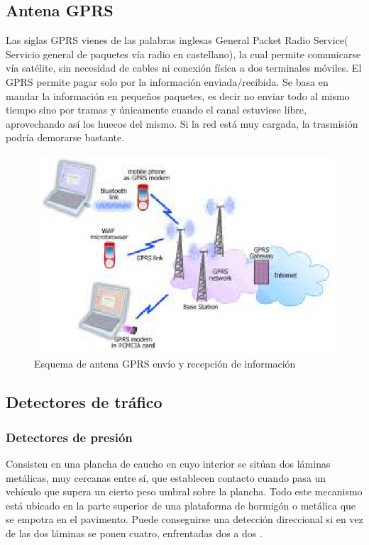 \subsection{Antena GPRS}
Las siglas GPRS vienes de las palabras inglesas General Packet Radio Service( Servicio general de paquetes vía radio en 
castellano), la cual permite comunicarse vía satélite, sin necesidad de cables ni conexión física a dos terminales móviles. 
El GPRS permite pagar solo por la información enviada/recibida. Se basa en mandar la información en pequeños paquetes, es 
decir no enviar todo al mismo tiempo sino por tramas y únicamente cuando el canal estuviese libre, aprovechando así los 
huecos del mismo. Si la red está muy cargada, la trasmisión podría demorarse bastante\cite{13}.
\begin{figure}[h]
    \centering
    \includegraphics[width=1\textwidth]{ima/descarga_phpzcLdzH}
    \caption{Esquema de antena GPRS envío y recepción de información \cite{13}}
    \label{fig:mesh6}
\end{figure}
\subsection{Detectores de tráfico}
\subsubsection{Detectores de presión}
Consisten en una plancha de caucho en cuyo interior se sitúan dos láminas metálicas, muy cercanas entre sí, que establecen 
contacto cuando pasa un vehículo que supera un cierto peso umbral sobre la plancha. Todo este mecanismo está ubicado en la 
parte superior de una plataforma de hormigón o metálica que se empotra en el pavimento. Puede conseguirse una detección 
direccional si en vez de las dos láminas se ponen cuatro, enfrentadas dos a dos \cite{14}.
